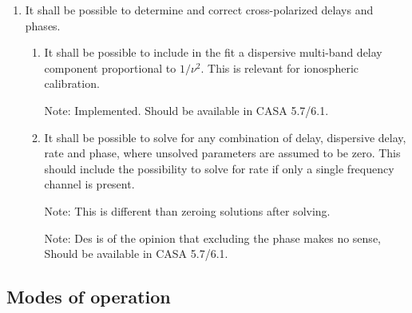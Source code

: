 \documentclass[11pt,a4paper]{article}
\begin{document}
\begin{enumerate}[subseclist]

\item It shall be possible to determine and correct cross-polarized
  delays and phases.

\begin{enumerate}[subsecsublist]

\item It shall be possible to include in the fit a dispersive
  multi-band delay component proportional to $1/\nu^2$. This is
  relevant for ionospheric calibration.

  Note: Implemented.  Should be available in CASA 5.7/6.1.

\item It shall be possible to solve for any combination of delay,
  dispersive delay, rate and phase, where unsolved parameters are
  assumed to be zero.  This should include the possibility to solve
  for rate if only a single frequency channel is present.

  Note: This is different than zeroing solutions after solving.
  
  Note: Des is of the opinion that excluding the phase makes no sense,
  Should be available in CASA 5.7/6.1.

\end{enumerate}

\end{enumerate}


\subsection{Modes of operation}
\end{document}
